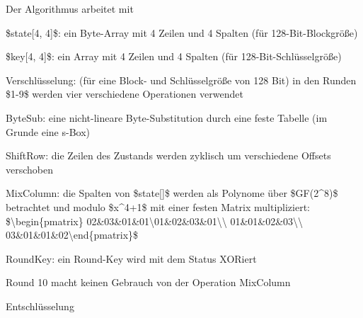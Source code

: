 \documentclass[a4paper]{article}
\begin{document}
\begin{multicols}{3}
      \begin{itemize*}
            \item
            Der Algorithmus arbeitet mit

            \begin{itemize*}
                  \item \$state{[}4, 4{]}\$: ein Byte-Array mit 4 Zeilen und 4 Spalten (für 128-Bit-Blockgröße)
                  \item \$key{[}4, 4{]}\$: ein Array mit 4 Zeilen und 4 Spalten (für 128-Bit-Schlüsselgröße)
            \end{itemize*}
            \item
            Verschlüsselung: (für eine Block- und Schlüsselgröße von 128 Bit) in
            den Runden \$1-9\$ werden vier verschiedene Operationen verwendet

            \begin{itemize*}
                  \item ByteSub: eine nicht-lineare Byte-Substitution durch eine feste Tabelle (im Grunde eine s-Box)
                  \item ShiftRow: die Zeilen des Zustands werden zyklisch um verschiedene Offsets verschoben
                  \item MixColumn: die Spalten von \$state{[}{]}\$ werden als Polynome über \$GF(2\^{}8)\$ betrachtet und modulo \$x\^{}4+1\$ mit einer festen Matrix multipliziert: \$\textbackslash begin\{pmatrix\} 02\&03\&01\&01\textbackslash01\&02\&03\&01\textbackslash\textbackslash{} 01\&01\&02\&03\textbackslash\textbackslash{} 03\&01\&01\&02\textbackslash end\{pmatrix\}\$
                  \item RoundKey: ein Round-Key wird mit dem Status XORiert
            \end{itemize*}
            \item
            Round 10 macht keinen Gebrauch von der Operation MixColumn
      \end{itemize*}


      \begin{itemize*}
            \item
            Entschlüsselung


\end{itemize*}
\end{multicols}
\end{document}
